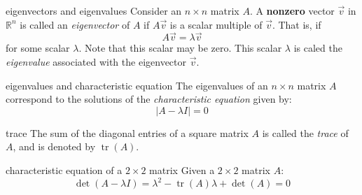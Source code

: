 \documentclass[avery5371,grid,letterpaper]{flashcards}
\newcommand{\Rn}{\mathbb{R}^{n}}
\newcommand{\nbyn}{n\!\times\!n}
\DeclareMathOperator{\tr}{tr}
\begin{document}
\begin{flashcard}[Definition]{eigenvectors and eigenvalues}
Consider an $\nbyn$ matrix $A$.  A \textbf{nonzero} vector $\vec{v}$ in $\Rn$ is called an \textit{eigenvector} of $A$ if $A\vec{v}$ is a scalar multiple of $\vec{v}$.  That is, if
\begin{displaymath}
A\vec{v} = \lambda\vec{v}
\end{displaymath}
for some scalar $\lambda$.  Note that this scalar may be zero.  This scalar $\lambda$ is caled the \textit{eigenvalue} associated with the eigenvector $\vec{v}$.
\end{flashcard}

\begin{flashcard}[Theorem]{eigenvalues and characteristic equation}
The eigenvalues of an $\nbyn$ matrix $A$ correspond to the solutions of the \textit{characteristic equation} given by:
\begin{displaymath}
\vert A - \lambda I \vert = 0
\end{displaymath}
\end{flashcard}

\begin{flashcard}[Definition]{trace}
The sum of the diagonal entries of a square matrix $A$ is called the \textit{trace} of $A$, and is denoted by $\tr(A)$.
\end{flashcard}

\begin{flashcard}[Theorem]{characteristic equation of a $2\!\times\!2$ matrix}
Given a $2\!\times\!2$ matrix $A$:
\begin{displaymath}
\det(A - \lambda I) = \lambda^2 - \tr(A)\lambda + \det(A) = 0
\end{displaymath}
\end{flashcard}
\end{document}
